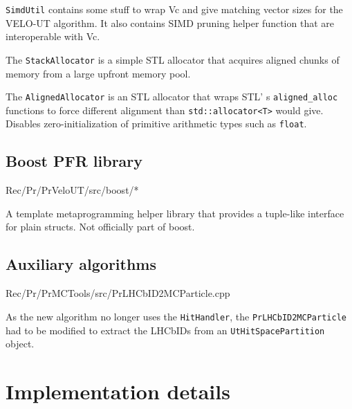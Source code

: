 \documentclass[12pt]{article}
\newcommand\tab[1][.7cm]{\hspace*{#1}}
\newcommand{\code}[1]{\texttt{#1}}
\begin{document}
\vspace{1pc}

\code{SimdUtil} contains some stuff to wrap Vc and give matching vector sizes for the VELO-UT algorithm. It also contains SIMD pruning helper function that are interoperable with Vc.

The \code{StackAllocator} is a simple STL allocator that acquires aligned chunks of memory from a large upfront memory pool.

The \code{AlignedAllocator} is an STL allocator that wraps STL'
s \code{aligned\_alloc} functions to force different alignment than 
\code{std::allocator\textless T\textgreater} would give. 
Disables zero-initialization of primitive arithmetic types such as \code{float}.


\subsection{Boost PFR library}

\begin{itshape}
    Rec/Pr/PrVeloUT/src/boost/*
\end{itshape}

\vspace{1pc}

A template metaprogramming helper library that provides a tuple-like interface for plain structs. Not officially part of boost.


\subsection{Auxiliary algorithms}

\begin{itshape}
    \tab Rec/Pr/PrMCTools/src/PrLHCbID2MCParticle.cpp
\end{itshape}

\vspace{1pc}

As the new algorithm no longer uses the \code{HitHandler}, the \code{PrLHCbID2MCParticle} had to be modified to extract the LHCbIDs from an \code{UtHitSpacePartition} object.



\section{Implementation details}
\end{document}
